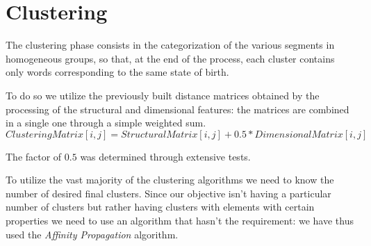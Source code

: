 \section{Clustering}
The clustering phase consists in the categorization of the various segments in homogeneous groups, so that, at the end of the process, each cluster contains only words corresponding to the same state of birth.

To do so we utilize the previously built distance matrices obtained by the processing of the structural and dimensional features: the matrices are combined in a single one through a simple weighted sum.
\begin{displaymath} 
ClusteringMatrix[i,j]= StructuralMatrix[i,j]+0.5*DimensionalMatrix[i,j]
\end{displaymath}

The factor of $0.5$ was determined through extensive tests.

To utilize the vast majority of the clustering algorithms we need to know the number of desired final clusters.
Since our objective isn't having a particular number of clusters but rather having clusters with elements with certain properties we need to use an algorithm that hasn't the requirement: we have thus used the \emph{Affinity Propagation} algorithm.
